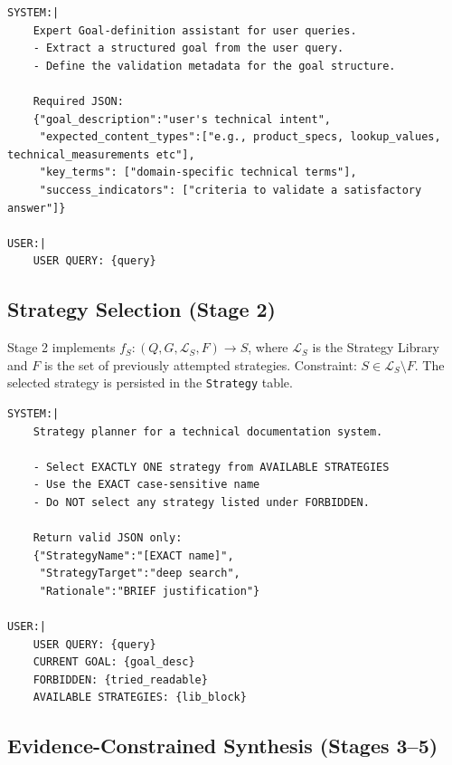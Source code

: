 \noindent\begin{minipage}{\columnwidth}
\begin{lstlisting}[style=promptstyle]
SYSTEM:|
    Expert Goal-definition assistant for user queries.
    - Extract a structured goal from the user query.
    - Define the validation metadata for the goal structure.
    
    Required JSON:
    {"goal_description":"user's technical intent",
     "expected_content_types":["e.g., product_specs, lookup_values, technical_measurements etc"],
     "key_terms": ["domain-specific technical terms"],
     "success_indicators": ["criteria to validate a satisfactory answer"]}
    
USER:|
    USER QUERY: {query}
\end{lstlisting}
\end{minipage}

\subsection{Strategy Selection (Stage 2)}

Stage 2 implements
\( f_S : (Q, G, \mathcal{L}_S, F) \rightarrow S \),
where \( \mathcal{L}_S \) is the Strategy Library and \( F \) is the set of previously attempted strategies.
Constraint: \( S \in \mathcal{L}_S \setminus F \).
The selected strategy is persisted in the \texttt{Strategy} table.

\noindent\begin{minipage}{\columnwidth}
\begin{lstlisting}[style=promptstyle]
SYSTEM:|
    Strategy planner for a technical documentation system.
    
    - Select EXACTLY ONE strategy from AVAILABLE STRATEGIES
    - Use the EXACT case-sensitive name
    - Do NOT select any strategy listed under FORBIDDEN.
    
    Return valid JSON only:
    {"StrategyName":"[EXACT name]",
     "StrategyTarget":"deep search",
     "Rationale":"BRIEF justification"}

USER:|
    USER QUERY: {query}
    CURRENT GOAL: {goal_desc}
    FORBIDDEN: {tried_readable}
    AVAILABLE STRATEGIES: {lib_block}
\end{lstlisting}
\end{minipage}

\subsection{Evidence-Constrained Synthesis (Stages 3--5)}

